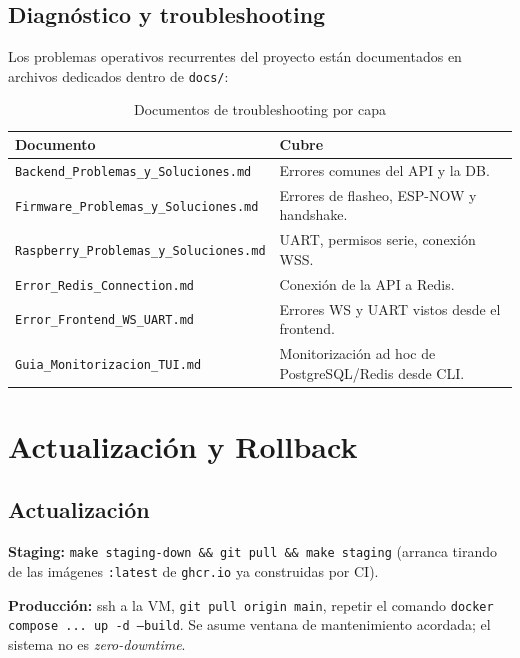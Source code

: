 \subsection{Diagnóstico y troubleshooting}

Los problemas operativos recurrentes del proyecto están documentados en archivos
dedicados dentro de \texttt{docs/}:

\begin{table}[H]
    \centering
    \caption{Documentos de troubleshooting por capa}
    \begin{tabularx}{\textwidth}{lX}
        \toprule
        \textbf{Documento}                         & \textbf{Cubre} \\
        \midrule
        \texttt{Backend\_Problemas\_y\_Soluciones.md}    & Errores comunes del API y la DB. \\
        \texttt{Firmware\_Problemas\_y\_Soluciones.md}   & Errores de flasheo, ESP-NOW y handshake. \\
        \texttt{Raspberry\_Problemas\_y\_Soluciones.md}  & UART, permisos serie, conexión WSS. \\
        \texttt{Error\_Redis\_Connection.md}             & Conexión de la API a Redis. \\
        \texttt{Error\_Frontend\_WS\_UART.md}            & Errores WS y UART vistos desde el frontend. \\
        \texttt{Guia\_Monitorizacion\_TUI.md}            & Monitorización ad hoc de PostgreSQL/Redis desde CLI. \\
        \bottomrule
    \end{tabularx}
    \label{tab:troubleshooting_docs}
\end{table}

\section{Actualización y Rollback}

\subsection{Actualización}

\textbf{Staging:} \texttt{make staging-down \&\& git pull \&\& make staging}
(arranca tirando de las imágenes \texttt{:latest} de \texttt{ghcr.io} ya
construidas por CI).

\textbf{Producción:} ssh a la VM, \texttt{git pull origin main}, repetir el comando
\texttt{docker compose ... up -d --build}. Se asume ventana de mantenimiento
acordada; el sistema no es \textit{zero-downtime}.

